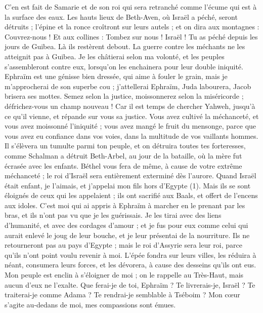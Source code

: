 \begin{multicols}{2}
C’en est fait de Samarie et de son roi qui sera retranché comme l'écume qui est à la surface des eaux.
Les hauts lieux de Beth-Aven, où Israël a péché, seront détruits ; l'épine et la ronce croîtront sur leurs autels ; et on dira aux montagnes : Couvrez-nous ! Et aux collines : Tombez sur nous !
Israël ! Tu as péché depuis les jours de Guibea. Là ils restèrent debout. La guerre contre les méchants ne les atteignit pas à Guibea.
Je les châtierai selon ma volonté, et les peuples s’assembleront contre eux, lorsqu’on les enchainera pour leur double iniquité.
Ephraïm est une génisse bien dressée, qui aime à fouler le grain, mais je m’approcherai de son superbe cou ; j’attellerai Ephraïm, Juda labourera, Jacob brisera ses mottes.
Semez selon la justice, moissonnerez selon la miséricorde ; défrichez-vous un champ nouveau ! Car il est temps de chercher Yahweh, jusqu'à ce qu'il vienne, et répande sur vous sa justice.
Vous avez cultivé la méchanceté, et vous avez moissonné l’iniquité ; vous avez mangé le fruit du mensonge, parce que vous avez eu confiance dans vos voies, dans la multitude de vos vaillants hommes.
Il s'élèvera un tumulte parmi ton peuple, et on détruira toutes tes forteresses, comme Schalman a détruit Beth-Arbel, au jour de la bataille, où la mère fut écrasée avec les enfants.
Béthel vous fera de même, à cause de votre extrême méchanceté ; le roi d'Israël sera entièrement exterminé dès l’aurore.
\VerseOne{}Quand Israël était enfant, je l'aimais, et j'appelai mon fils hors d'Egypte (1).
Mais ils se sont éloignés de ceux qui les appelaient ; ils ont sacrifié aux Baals, et offert de l’encens aux idoles.
C’est moi qui ai appris à Ephraïm à marcher en le prenant par les bras, et ils n'ont pas vu que je les guérissais.
Je les tirai avec des liens d'humanité, et avec des cordages d'amour ; et je fus pour eux comme celui qui aurait enlevé le joug de leur bouche, et je leur présentai de la nourriture.
Ils ne retourneront pas au pays d'Egypte ; mais le roi d'Assyrie sera leur roi, parce qu'ils n'ont point voulu revenir à moi.
L'épée fondra sur leurs villes, les réduira à néant, consumera leurs forces, et les dévorera, à cause des desseins qu’ils ont eus.
Mon peuple est enclin à s’éloigner de moi ; on le rappelle au Très-Haut, mais aucun d'eux ne l'exalte.
Que ferai-je de toi, Ephraïm ? Te livrerais-je, Israël ? Te traiterai-je comme Adama ? Te rendrai-je semblable à Tséboim ? Mon cœur s’agite au-dedans de moi, mes compassions sont émues.

\end{multicols}
